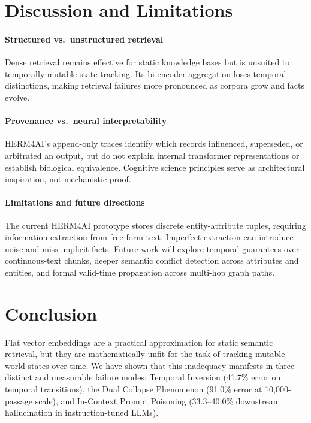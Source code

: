 \documentclass[11pt,a4paper,twocolumn]{article}
\newcommand{\herm}{\textsc{HERM4AI}}
\begin{document}
\section{Discussion and Limitations}
\label{sec:discussion}

\paragraph{Structured vs.\ unstructured retrieval}
Dense retrieval remains effective for static knowledge bases but is
unsuited to temporally mutable state tracking. Its bi-encoder
aggregation loses temporal distinctions, making retrieval failures
more pronounced as corpora grow and facts evolve.

\paragraph{Provenance vs.\ neural interpretability}
\herm{}'s append-only traces identify which records influenced,
superseded, or arbitrated an output, but do not explain internal
transformer representations or establish biological equivalence.
Cognitive science principles serve as architectural inspiration,
not mechanistic proof.

\paragraph{Limitations and future directions}
The current \herm{} prototype stores discrete entity-attribute
tuples, requiring information extraction from free-form text.
Imperfect extraction can introduce noise and miss implicit facts.
Future work will explore temporal guarantees over continuous-text
chunks, deeper semantic conflict detection across attributes and
entities, and formal valid-time propagation across multi-hop graph
paths.


\section{Conclusion}
\label{sec:conclusion}

Flat vector embeddings are a practical approximation for static
semantic retrieval, but they are mathematically unfit for the task of
tracking mutable world states over time.  We have shown that this
inadequacy manifests in three distinct and measurable failure modes:
Temporal Inversion (41.7\% error on temporal transitions), the Dual
Collapse Phenomenon (91.0\% error at 10{,}000-passage scale), and
In-Context Prompt Poisoning (33.3--40.0\% downstream hallucination in
instruction-tuned LLMs).
\end{document}

